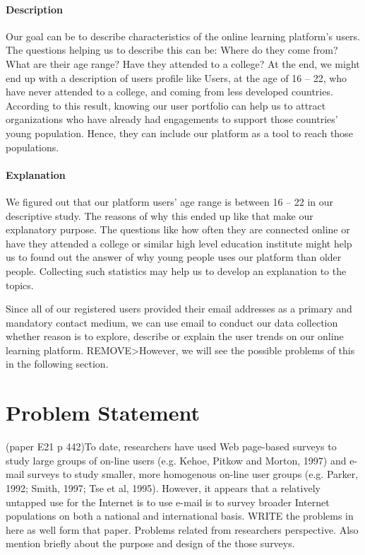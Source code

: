 \paragraph{Description}
Our goal can be to describe characteristics of the online learning platform's users. The questions helping us to describe this can be: Where do they come from? What are their age range? Have they attended to a college? At the end, we might end up with a description of users profile like Users, at the age of 16 -- 22, who have never attended to a college, and coming from less developed countries. According to this result, knowing our user portfolio can help us to attract organizations who have already had engagements to support those countries' young population. Hence, they can include our platform as a tool to reach those populations.

\paragraph{Explanation}
We figured out that our platform users' age range is between 16 -- 22 in our descriptive study. The reasons of why this ended up like that make our explanatory purpose. The questions like how often they are connected online or have they attended a college or similar high level education institute might help us to found out the answer of why young people uses our platform than older people. Collecting such statistics may help us to develop an explanation to the topics.

\vspace{1cm}
Since all of our registered users provided their email addresses as a primary and mandatory contact medium, we can use email to conduct our data collection whether reason is to explore, describe or explain the user trends on our online learning platform. REMOVE>However, we will see the possible problems of this in the following section.

\section{Problem Statement}
\label{sec:2:Problem}
(paper E21 p 442)To date, researchers have used Web page-based surveys to study large groups of on-line users (e.g. Kehoe, Pitkow and Morton, 1997) and e-mail surveys to study smaller, more homogenous on-line user groups (e.g. Parker, 1992; Smith, 1997; Tse et al, 1995). However, it appears that a relatively untapped use for the Internet is to use e-mail is to survey broader Internet populations on both a national and international basis. WRITE the problems in here as well form that paper. Problems related from researchers perspective. Also mention briefly about the purpose and design of the those surveys.
\vspace{1cm}

